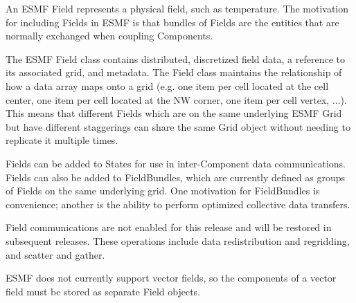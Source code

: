
An ESMF Field represents a physical field, such as temperature.
The motivation for including Fields in ESMF is that bundles of 
Fields are the entities that are normally exchanged when coupling
Components.  

The ESMF Field class contains distributed, discretized field data, a reference 
to its associated grid, and metadata.  The Field class maintains the
relationship of how a data array maps onto a grid (e.g. one item per
cell located at the cell center, one item per cell located at the NW
corner,  one item per cell vertex, ...).  This means that different Fields
which are on the same underlying ESMF Grid but have different
staggerings can share the same Grid object without needing to replicate
it multiple times. 

Fields can be added to States for use in inter-Component
data communications.  Fields can also be added to FieldBundles,
which are currently defined as groups of Fields on the same underlying
grid.  One motivation for FieldBundles is convenience; another is the
ability to perform optimized collective data transfers.  

Field communications are not enabled for this release and will
be restored in subsequent releases.   These operations include
data redistribution and regridding, and scatter and gather.

ESMF does not currently support vector fields, so the components of 
a vector field must be stored as separate Field objects.  


